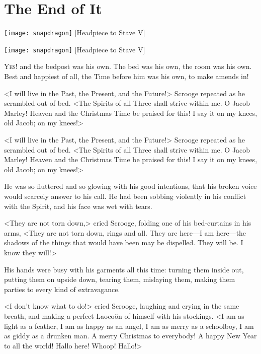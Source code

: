 \chapter{The End of It}

\begin{letter}
\begin{minipage}[c]{\textwidth}
\texttt{[image: snapdragon]}
[Headpiece to Stave V]{}
\end{minipage}
\end{letter}

\begin{a4}
\begin{minipage}[c]{\textwidth}
\texttt{[image: snapdragon]}
[Headpiece to Stave V]{}
\end{minipage}
\end{a4}

\lettrine[lines=4]{Y}{es!} and the bedpost was his own. The bed was his own, the room was his own. Best and happiest of all, the Time before him was his own, to make amends in!

\zz
<I will live in the Past, the Present, and the Future!> Scrooge repeated as he scrambled out of bed. <The Spirits of all Three shall strive within me. O Jacob Marley! Heaven and the Christmas Time be praised for this! I say it on my knees, old Jacob; on my knees!>


<I will live in the Past, the Present, and the Future!> Scrooge repeated as he scrambled out of bed. <The Spirits of all Three shall strive within me. O Jacob Marley! Heaven and the Christmas Time be praised for this! I say it on my knees, old Jacob; on my knees!>

He was so fluttered and so glowing with his good intentions, that his broken voice would scarcely answer to his call. He had been sobbing violently in his conflict with the Spirit, and his face was wet with tears.

<They are not torn down,> cried Scrooge, folding one of his bed-curtains in his arms, <They are not torn down, rings and all. They are here—I am here—the shadows of the things that would have been may be dispelled. They will be. I know they will!>

His hands were busy with his garments all this time: turning them inside out, putting them on upside down, tearing them, mislaying them, making them parties to every kind of extravagance.

<I don't know what to do!> cried Scrooge, laughing and crying in the same breath, and making a perfect Laoco\"on of himself with his stockings. <I am as light as a feather, I am as happy as an angel, I am as merry as a schoolboy, I am as giddy as a drunken man. A merry Christmas to everybody! A happy New Year to all the world! Hallo here! Whoop! Hallo!>

